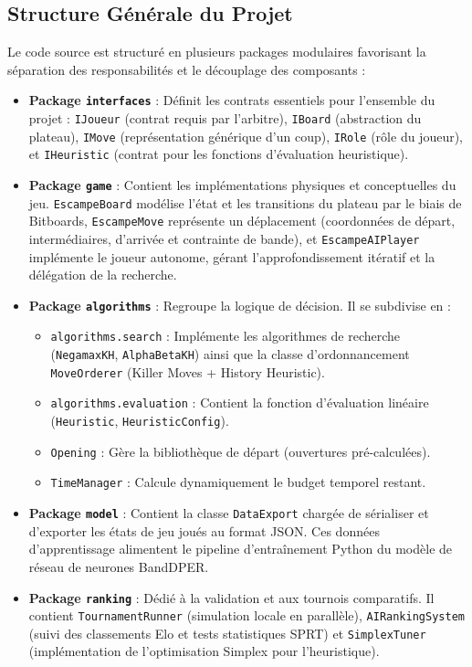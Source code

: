 \documentclass[12pt,a4paper]{article}
\begin{document}
\subsection{Structure Générale du Projet}
Le code source est structuré en plusieurs packages modulaires favorisant la séparation des responsabilités et le découplage des composants :
\begin{itemize}
    \item \textbf{Package \texttt{interfaces}} : Définit les contrats essentiels pour l'ensemble du projet : \texttt{IJoueur} (contrat requis par l'arbitre), \texttt{IBoard} (abstraction du plateau), \texttt{IMove} (représentation générique d'un coup), \texttt{IRole} (rôle du joueur), et \texttt{IHeuristic} (contrat pour les fonctions d'évaluation heuristique).
    \item \textbf{Package \texttt{game}} : Contient les implémentations physiques et conceptuelles du jeu. \texttt{EscampeBoard} modélise l'état et les transitions du plateau par le biais de Bitboards, \texttt{EscampeMove} représente un déplacement (coordonnées de départ, intermédiaires, d'arrivée et contrainte de bande), et \texttt{EscampeAIPlayer} implémente le joueur autonome, gérant l'approfondissement itératif et la délégation de la recherche.
    \item \textbf{Package \texttt{algorithms}} : Regroupe la logique de décision. Il se subdivise en :
        \begin{itemize}
            \item \texttt{algorithms.search} : Implémente les algorithmes de recherche (\texttt{NegamaxKH}, \texttt{AlphaBetaKH}) ainsi que la classe d'ordonnancement \texttt{MoveOrderer} (Killer Moves + History Heuristic).
            \item \texttt{algorithms.evaluation} : Contient la fonction d'évaluation linéaire (\texttt{Heuristic}, \texttt{HeuristicConfig}).
            \item \texttt{Opening} : Gère la bibliothèque de départ (ouvertures pré-calculées).
            \item \texttt{TimeManager} : Calcule dynamiquement le budget temporel restant.
        \end{itemize}
    \item \textbf{Package \texttt{model}} : Contient la classe \texttt{DataExport} chargée de sérialiser et d'exporter les états de jeu joués au format JSON. Ces données d'apprentissage alimentent le pipeline d'entraînement Python du modèle de réseau de neurones BandDPER.
    \item \textbf{Package \texttt{ranking}} : Dédié à la validation et aux tournois comparatifs. Il contient \texttt{TournamentRunner} (simulation locale en parallèle), \texttt{AIRankingSystem} (suivi des classements Elo et tests statistiques SPRT) et \texttt{SimplexTuner} (implémentation de l'optimisation Simplex pour l'heuristique).

\end{itemize}
\end{document}
